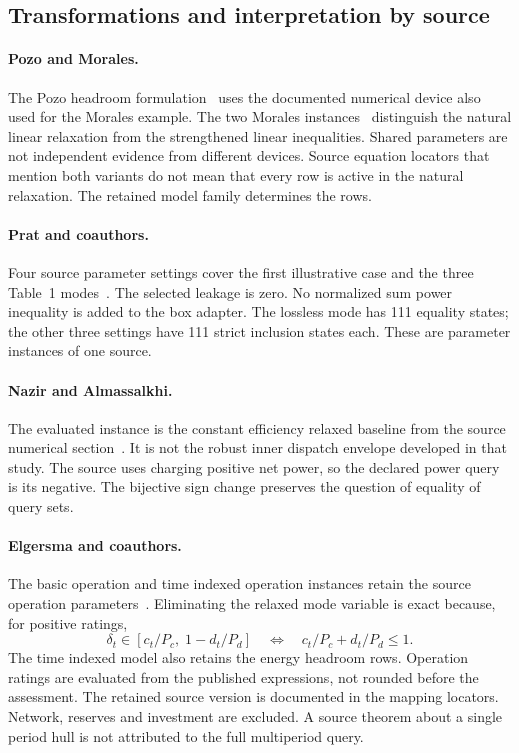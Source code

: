 \subsection{Transformations and interpretation by source}
\paragraph{Pozo and Morales.}
The Pozo headroom formulation~\cite{pozo2023convex} uses the documented
numerical device also used for the Morales example. The two Morales
instances~\cite{morales2025linear} distinguish the natural linear
relaxation from the strengthened linear inequalities. Shared parameters
are not independent evidence from different devices. Source equation
locators that mention both variants do not mean that every row is active
in the natural relaxation. The retained model family determines the rows.

\paragraph{Prat and coauthors.}
Four source parameter settings cover the first illustrative case and the
three Table~1 modes~\cite{prat2025sufficient}. The selected leakage is zero.
No normalized sum power inequality is added to the box adapter. The lossless
mode has 111 equality states; the other three settings have 111 strict
inclusion states each. These are parameter instances of one source.

\paragraph{Nazir and Almassalkhi.}
The evaluated instance is the constant efficiency relaxed baseline from
the source numerical section~\cite{nazir2021guaranteeing}. It is not the
robust inner dispatch envelope developed in that study. The source uses
charging positive net power, so the declared power query is its negative.
The bijective sign change preserves the question of equality of query sets.

\paragraph{Elgersma and coauthors.}
The basic operation and time indexed operation instances retain the source
operation parameters~\cite{elgersma2026tight}. Eliminating the relaxed mode
variable is exact because, for positive ratings,
\begin{equation}
\delta_t\in[c_t/P_c,\;1-d_t/P_d]
\quad\Longleftrightarrow\quad c_t/P_c+d_t/P_d\leq 1 .\label{eq:mode_elimination}
\end{equation}
The time indexed model also retains the energy headroom rows. Operation
ratings are evaluated from the published expressions, not rounded before
the assessment. The retained source version is documented in the mapping
locators. Network, reserves and investment are excluded. A source theorem
about a single period hull is not attributed to the full multiperiod query.

